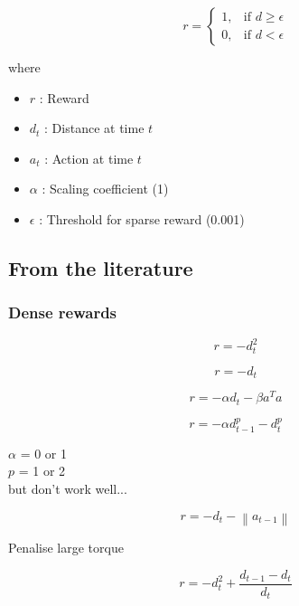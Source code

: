 \documentclass{article}
\newcommand{\norm}[1]{\left\lVert#1\right\rVert}
\begin{document}
\begin{equation}
r = \begin{cases}
    1, & \text{if $d \geq \epsilon $}\\
    0, & \text{if  $d < \epsilon $}
  \end{cases}
\end{equation}

where
\begin{itemize}  
\item $r$ : Reward
\item $d_t$ : Distance at time $t$ 
\item $a_t$ : Action at time $t$ 
\item $\alpha$ : Scaling coefficient (1)
\item $\epsilon$ : Threshold for sparse reward (0.001)
\end{itemize}


\subsection{From the literature}
\subsubsection{Dense rewards}

\begin{equation}
r = - d_t^2
\end{equation}


\begin{equation}
r = - d_t
\end{equation}


\begin{equation}
r = -\alpha d_t - \beta a^T a
\end{equation}

\begin{equation}
r = -\alpha d_{t-1}^p - d_t^p 
\end{equation}

$\alpha$ = 0 or 1 \\
$p$ = 1 or 2 \\
but don't work well...

\begin{equation}
r = - d_t -  \norm{a_{t-1}}
\end{equation}

Penalise large torque

\begin{equation}
r = - d_t^2+ \frac{d_{t-1} - d_t}{d_t}
\end{equation}
\end{document}
